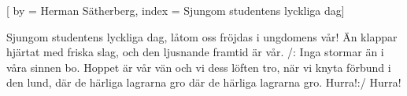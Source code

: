 

[ 
by = {Herman Sätherberg},
index = {Sjungom studentens lyckliga dag}]

\beginverse* 
Sjungom studentens lyckliga dag,
låtom oss fröjdas i ungdomens vår!
Än klappar hjärtat med friska slag,
och den ljusnande framtid är vår.
/: Inga stormar än 
i våra sinnen bo.
Hoppet är vår vän 
och vi dess löften tro,
när vi knyta förbund i den lund,
där de härliga lagrarna gro
där de härliga lagrarna gro.
Hurra!:/
Hurra!
\endverse
\endsong
